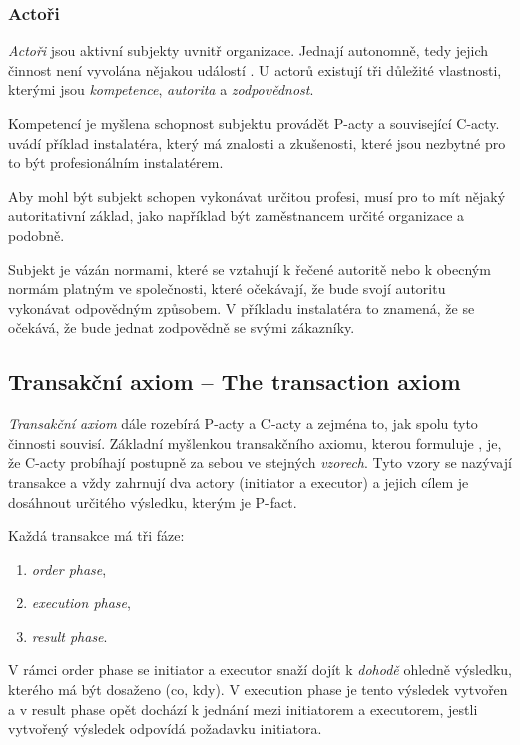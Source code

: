 \subsubsection{Actoři}
\textit{Actoři} jsou aktivní subjekty uvnitř organizace. Jednají autonomně, tedy jejich činnost není vyvolána nějakou událostí \cite{Dietz2006}.  U actorů existují tři důležité vlastnosti, kterými jsou \textit{kompetence}, \textit{autorita} a \textit{zodpovědnost}.

Kompetencí je myšlena schopnost subjektu provádět P-acty a související C-acty. \cite{Dietz2006} uvádí příklad instalatéra, který má znalosti a zkušenosti, které jsou nezbytné pro to být profesionálním instalatérem.

Aby mohl být subjekt schopen vykonávat určitou profesi, musí pro to mít nějaký autoritativní základ, jako například být zaměstnancem určité organizace a podobně.

Subjekt je vázán normami, které se vztahují k řečené autoritě nebo k obecným normám platným ve společnosti, které očekávají, že bude svojí autoritu vykonávat odpovědným způsobem. V příkladu instalatéra to znamená, že se očekává, že bude jednat zodpovědně se svými zákazníky.

\subsection{Transakční axiom – The transaction axiom} \label{sec:transakcni_axiom}
\textit{Transakční axiom} dále rozebírá P-acty a C-acty a zejména to, jak spolu tyto činnosti souvisí. Základní myšlenkou transakčního axiomu, kterou formuluje \cite{Dietz2006}, je, že C-acty probíhají postupně za sebou ve stejných \textit{vzorech}. Tyto vzory se nazývají transakce a vždy zahrnují dva actory (initiator a executor) a jejich cílem je dosáhnout určitého výsledku, kterým je P-fact.

Každá transakce má tři fáze:

\begin{enumerate}
\item \textit{order phase},
\item \textit{execution phase},
\item \textit{result phase}.
\end{enumerate}

V rámci order phase se initiator a executor snaží dojít k \textit{dohodě} ohledně výsledku, kterého má být dosaženo (co, kdy). V execution phase je tento výsledek vytvořen a v result phase opět dochází k jednání mezi initiatorem a executorem, jestli vytvořený výsledek odpovídá požadavku initiatora.

